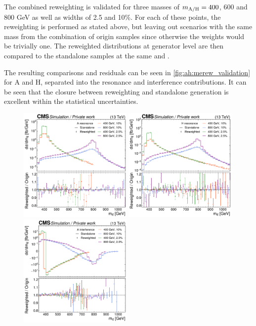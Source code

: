The combined reweighting is validated for three masses of $m_{\mathrm{A/H}} = 400$, 600 and 800 GeV as well as widths of 2.5 and 10\%. For each of these points, the reweighting is performed as stated above, but leaving out \AH scenarios with the same mass from the combination of origin samples since otherwise the weights would be trivially one. The reweighted \mtt distributions at generator level are then compared to the standalone samples at the same \mAH and \wAH.

The resulting comparisons and residuals can be seen in \cref{fig:ah:merew_validation} for A and H, separated into the resonance and interference contributions. It can be seen that the closure between reweighting and standalone generation is excellent within the statistical uncertainties.

\begin{figure}[!p]
    \centering
    \includegraphics[width=0.49\textwidth]{figures/ah/me_reweighting/A_res.pdf}
    \hfill
    \includegraphics[width=0.49\textwidth]{figures/ah/me_reweighting/H_res.pdf}
    \includegraphics[width=0.49\textwidth]{figures/ah/me_reweighting/A_int.pdf}

\end{figure}
